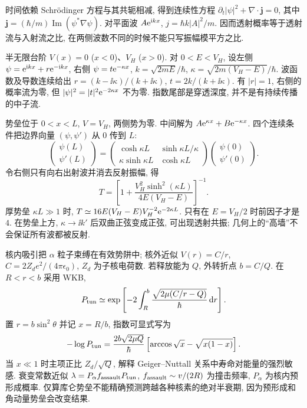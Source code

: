 \label{ch:tunnel}
时间依赖 Schrödinger 方程与其共轭相减, 得到连续性方程 $\partial_t|\psi|^2+\nabla\cdot\mathbf j=0$, 其中 $\mathbf j=(\hbar/m)\operatorname{Im}(\psi^*\nabla\psi)$. 对平面波 $A\mathrm e^{\mathrm i kx}$, $j=\hbar k|A|^2/m$. 因而透射概率等于透射流与入射流之比, 在两侧波数不同的时候不能只写振幅模平方之比.

半无限台阶 $V(x)=0$ ($x<0$)、$V_H$ ($x>0$). 对 $0<E<V_H$, 设左侧 $\psi=\mathrm e^{\mathrm i kx}+r\mathrm e^{-\mathrm i kx}$, 右侧 $\psi=t\mathrm e^{-\kappa x}$, $k=\sqrt{2mE}/\hbar$, $\kappa=\sqrt{2m(V_H-E)}/\hbar$. 波函数及导数连续给出
$r=(k-\ii\kappa)/(k+\ii\kappa)$, $t=2k/(k+\ii\kappa)$. 有 $|r|=1$, 右侧的概率流为零, 但 $|\psi|^2=|t|^2\mathrm e^{-2\kappa x}$ 不为零. 指数尾部是穿透深度, 并不是有持续传播的中子流.

势垒位于 $0<x<L$, $V=V_H$, 两侧势为零. 中间解为 $A\mathrm e^{\kappa x}+B\mathrm e^{-\kappa x}$. 四个连续条件把边界向量 $(\psi,\psi')$ 从 $0$ 传到 $L$:
\begin{equation}
 \begin{pmatrix}\psi(L)\\\psi'(L)\end{pmatrix}=
 \begin{pmatrix}\cosh\kappa L&\sinh\kappa L/\kappa\\\kappa\sinh\kappa L&\cosh\kappa L\end{pmatrix}
 \begin{pmatrix}\psi(0)\\\psi'(0)\end{pmatrix}.
\end{equation}
令右侧只有向右出射波并消去反射振幅, 得
\begin{equation}\label{eq:barrier}
 T=\left[1+\frac{V_H^2\sinh^2(\kappa L)}{4E(V_H-E)}\right]^{-1}.
\end{equation}
厚势垒 $\kappa L\gg1$ 时, $T\simeq16E(V_H-E)V_H^{-2}\mathrm e^{-2\kappa L}$. 只有在 $E=V_H/2$ 时前因子才是 $4$. 在势垒上方, $\kappa\to\ii k'$ 后双曲正弦变成正弦, 可出现透射共振; 几何上的``高墙''不会保证所有波都被反射.

核内吸引把 $\alpha$ 粒子束缚在有效势阱中; 核外近似 $V(r)=C/r$, $C=2Z_de^2/(4\pi\epsilon_0)$, $Z_d$ 为子核电荷数. 若释放能为 $Q$, 外转折点 $b=C/Q$. 在 $R<r<b$ 采用 WKB,
\begin{equation}
 P_{\rm tun}\simeq\exp\left[-2\int_R^b\frac{\sqrt{2\mu(C/r-Q)}}{\hbar}\,\mathrm d r\right].
\end{equation}
置 $r=b\sin^2\theta$ 并记 $x=R/b$, 指数可显式写为
\begin{equation}
 -\log P_{\rm tun}=\frac{2b\sqrt{2\mu Q}}{\hbar}
 \left[\arccos\sqrt{x}-\sqrt{x(1-x)}\right].
\end{equation}
当 $x\ll1$ 时主项正比 $Z_d/\sqrt Q$, 解释 Geiger--Nuttall 关系中寿命对能量的强烈敏感. 衰变常数近似 $\lambda=P_\alpha f_{\rm assault}P_{\rm tun}$, $f_{\rm assault}\sim v/(2R)$ 为撞击频率, $P_\alpha$ 为核内预形成概率. 仅算库仑势垒不能精确预测跨越各种核素的绝对半衰期, 因为预形成和角动量势垒会改变结果.

